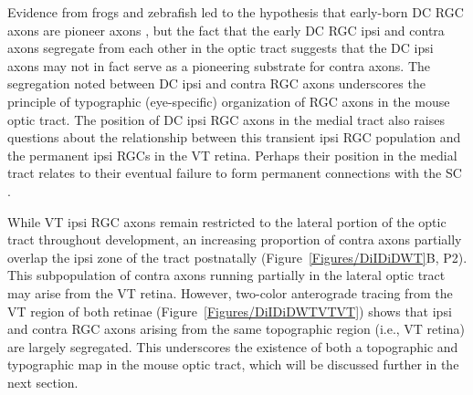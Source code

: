 Evidence from frogs and zebrafish led to the hypothesis that early-born DC RGC axons are pioneer axons \cite{holt1984does,pittman2008pathfinding}, but the fact that the early DC RGC ipsi and contra axons segregate from each other in the optic tract \cite{soares2015transient} suggests that the DC ipsi axons may not in fact serve as a pioneering substrate for contra axons.
The segregation noted between DC ipsi and contra RGC axons underscores the principle of typographic (eye-specific) organization of RGC axons in the mouse optic tract.
The position of DC ipsi RGC axons in the medial tract also raises questions about the relationship between this transient ipsi RGC population and the permanent ipsi RGCs in the VT retina.
Perhaps their position in the medial tract relates to their eventual failure to form permanent connections with the SC \cite{soares2015transient}.

While VT ipsi RGC axons remain restricted to the lateral portion of the optic tract throughout development, an increasing proportion of contra axons partially overlap the ipsi zone of the tract postnatally (Figure~\ref{Figures/DiIDiDWT}B, P2).
This subpopulation of contra axons running partially in the lateral optic tract may arise from the VT retina.
However, two-color anterograde tracing from the VT region of both retinae (Figure~\ref{Figures/DiIDiDWTVTVT}) shows that ipsi and contra RGC axons arising from the same topographic region (i.e., VT retina) are largely segregated.
This underscores the existence of both a topographic and typographic map in the mouse optic tract, which will be discussed further in the next section.

